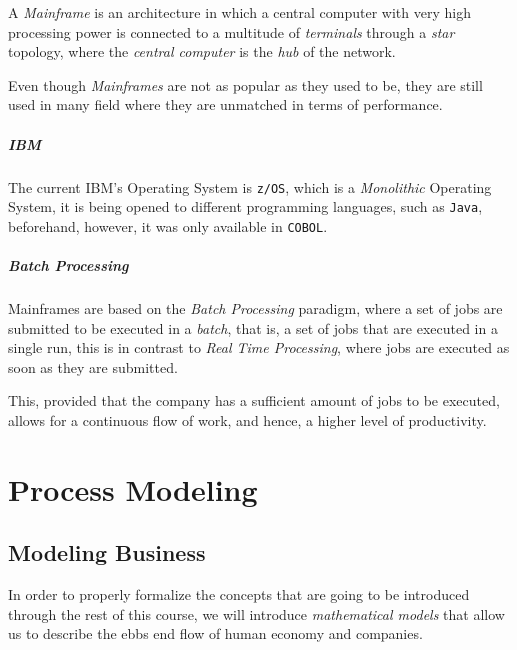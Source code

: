 \documentclass[openright, twoside, twocolumn]{report}
\begin{document}
    \begin{definition}
      \label{def:mainf}
      A \emph{Mainframe} is an architecture in which a central computer with very high 
      processing power is connected to a multitude of \emph{terminals} through a 
      \emph{star} topology, where the \emph{central computer} is the \emph{hub} of the
      network.
    \end{definition}

    Even though \emph{Mainframes} are not as popular as they used to be, they are still used in many
    field where they are unmatched in terms of performance.

    \paragraph{IBM}
    
    The current IBM's Operating System is \texttt{z/OS}, which is a \emph{Monolithic} Operating System, 
    it is being opened to different programming languages, such as \texttt{Java}, beforehand, however,
    it was only available in \texttt{COBOL}.

    \paragraph{Batch Processing} 
    
    Mainframes are based on the \emph{Batch Processing} paradigm, where a set of jobs are submitted to
    be executed in a \emph{batch}, that is, a set of jobs that are executed in a single run, this is
    in contrast to \emph{Real Time Processing}, where jobs are executed as soon as they are submitted.

    This, provided that the company has a sufficient amount of jobs to be executed, allows for a continuous
    flow of work, and hence, a higher level of productivity.

    \chapter{Process Modeling}

    \section{Modeling Business} 
    
    In order to properly formalize the concepts that are going to be introduced through the rest 
    of this course, we will introduce \emph{mathematical models} that allow us to describe the 
    ebbs end flow of human economy and companies.
\end{document}
